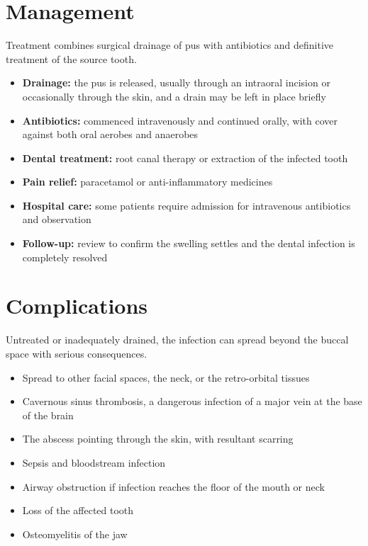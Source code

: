\section*{Management}
Treatment combines surgical drainage of pus with antibiotics and definitive treatment of the source tooth.

\begin{itemize}
    \item \textbf{Drainage:} the pus is released, usually through an intraoral incision or occasionally through the skin, and a drain may be left in place briefly
    \item \textbf{Antibiotics:} commenced intravenously and continued orally, with cover against both oral aerobes and anaerobes
    \item \textbf{Dental treatment:} root canal therapy or extraction of the infected tooth
    \item \textbf{Pain relief:} paracetamol or anti-inflammatory medicines
    \item \textbf{Hospital care:} some patients require admission for intravenous antibiotics and observation
    \item \textbf{Follow-up:} review to confirm the swelling settles and the dental infection is completely resolved
\end{itemize}

\section*{Complications}
Untreated or inadequately drained, the infection can spread beyond the buccal space with serious consequences.

\begin{itemize}
    \item Spread to other facial spaces, the neck, or the retro-orbital tissues
    \item Cavernous sinus thrombosis, a dangerous infection of a major vein at the base of the brain
    \item The abscess pointing through the skin, with resultant scarring
    \item Sepsis and bloodstream infection
    \item Airway obstruction if infection reaches the floor of the mouth or neck
    \item Loss of the affected tooth
    \item Osteomyelitis of the jaw
\end{itemize}

